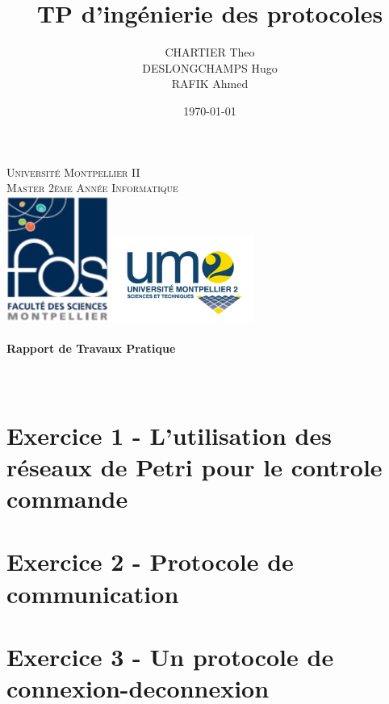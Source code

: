 \documentclass[]{article}
\title{TP d'ingénierie des protocoles}
\author{
  CHARTIER Theo \\
  DESLONGCHAMPS Hugo \\
  RAFIK Ahmed}
\date\today
\begin{document}
\makeatletter
  \begin{titlepage}
    \centering
        {\large \textsc{Université Montpellier II}}\\
        \textsc{Master 2ème Année Informatique}\\
        \vspace{1cm}
        \includegraphics[width=0.25\textwidth]{images/logo.png}
        \hfill
        \includegraphics[width=0.35\textwidth]{images/logo2.png}\\
        \vspace{1cm}
               {\large\textbf{	\@date\\
                   Rapport de Travaux Pratique}}\\
               \vfill
                   {\LARGE \textbf{\@title}} \\
                   \vspace{2em}
                          {\large \@author} \\
                          \vfill
  \end{titlepage}
\makeatother

\section{Exercice 1 - L'utilisation des réseaux de Petri pour le controle commande}

\section{Exercice 2 - Protocole de communication}

\section{Exercice 3 - Un protocole de connexion-deconnexion}

\end{document}

